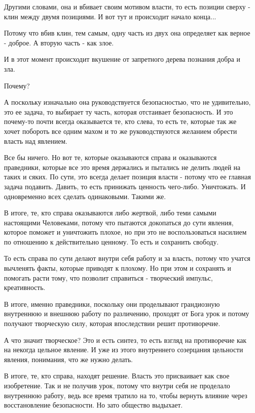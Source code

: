 Другими словами, она и вбивает своим мотивом власти, то есть позиции сверху -
клин между двумя позициями. И вот тут и происходит начало конца...

Потому что вбив клин, тем самым, одну часть из двух она определяет как верное -
доброе. А вторую часть - как злое. 

И в этот момент происходит вкушение от запретного дерева познания добра и зла. 

Почему? 

А поскольку изначально она руководствуется безопасностью, что не удивительно,
это ее задача, то выбирает ту часть, которая отстаивает безопасность. И это
почему-то почти всегда оказывается те, кто слева, то есть те, которые так же
хочет побороть все одним махом и то же руководствуются желанием обрести власть
над явлением. 

Все бы ничего. Но вот те, которые оказываются справа и оказываются праведники,
которые все это время держались и пытались не делить людей на таких и сяких. По
сути, это всегда делает позиция власти - потому что ее главная задача подавить.
Давить, то есть принижать ценность чего-либо. Уничтожать. И одновременно всех
сделать одинаковыми. Такими же. 

В итоге, те, кто справа оказываются либо жертвой, либо теми самыми настоящими
Человеками, потому что пытаются докопаться до сути явления, которое поможет и
уничтожить плохое, но при это не воспользоваться насилием по отношению к
действительно ценному. То есть и сохранить свободу. 

То есть справа по сути делают внутри себя работу и за власть, потому что учатся
вычленять факты, которые приводят к плохому. Но при этом и сохранять и помогать
расти тому, что позволит справиться - творческий импульс, креативность. 

В итоге, именно праведники, поскольку они проделывают грандиозную внутреннюю и
внешнюю работу по различению, проходят от Бога урок и потому получают
творческую силу, которая впоследствии решит противоречие. 

А что значит творческое? Это и есть синтез, то есть взгляд на противоречие как
на некогда цельное явление. И уже из этого внутреннего созерцания цельности
явления, понимания, что же нужно делать. 

В итоге, те, кто справа, находят решение. Власть это присваивает как свое
изобретение. Так и не получив урок, потому что внутри себя не проделало
внутреннюю работу, ведь все время тратило на то, чтобы вернуть влияние через
восстановление безопасности. Но зато общество выдыхает. 


